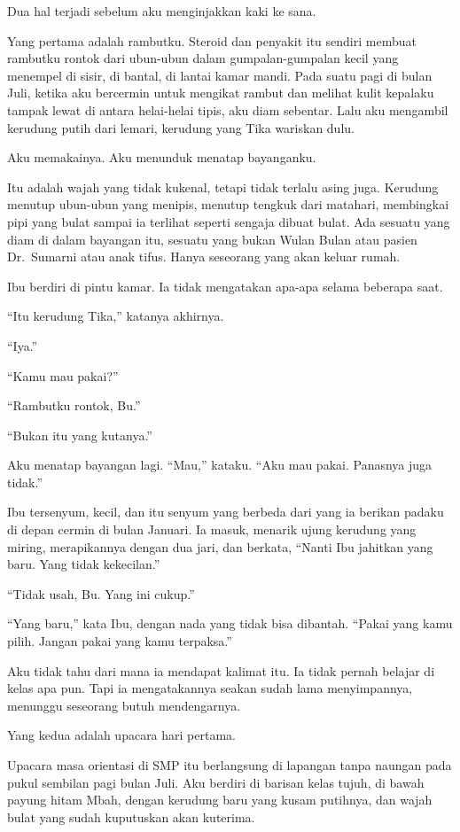 \documentclass[11pt,twoside,openany]{book}
\makeatletter
\newcommand{\scenebreak}{\par\vspace{0.9em}{\centering\textsc{*\hspace{0.7em}*\hspace{0.7em}*}\par}\vspace{0.9em}\@afterindentfalse\@afterheading}
\makeatother
\begin{document}
Dua hal terjadi sebelum aku menginjakkan kaki ke sana.

Yang pertama adalah rambutku. Steroid dan penyakit itu sendiri membuat rambutku rontok dari ubun-ubun dalam gumpalan-gumpalan kecil yang menempel di sisir, di bantal, di lantai kamar mandi. Pada suatu pagi di bulan Juli, ketika aku bercermin untuk mengikat rambut dan melihat kulit kepalaku tampak lewat di antara helai-helai tipis, aku diam sebentar. Lalu aku mengambil kerudung putih dari lemari, kerudung yang Tika wariskan dulu.

Aku memakainya. Aku menunduk menatap bayanganku.

Itu adalah wajah yang tidak kukenal, tetapi tidak terlalu asing juga. Kerudung menutup ubun-ubun yang menipis, menutup tengkuk dari matahari, membingkai pipi yang bulat sampai ia terlihat seperti sengaja dibuat bulat. Ada sesuatu yang diam di dalam bayangan itu, sesuatu yang bukan Wulan Bulan atau pasien Dr.~Sumarni atau anak tifus. Hanya seseorang yang akan keluar rumah.

Ibu berdiri di pintu kamar. Ia tidak mengatakan apa-apa selama beberapa saat.

``Itu kerudung Tika,'' katanya akhirnya.

``Iya.''

``Kamu mau pakai?''

``Rambutku rontok, Bu.''

``Bukan itu yang kutanya.''

Aku menatap bayangan lagi. ``Mau,'' kataku. ``Aku mau pakai. Panasnya juga tidak.''

Ibu tersenyum, kecil, dan itu senyum yang berbeda dari yang ia berikan padaku di depan cermin di bulan Januari. Ia masuk, menarik ujung kerudung yang miring, merapikannya dengan dua jari, dan berkata, ``Nanti Ibu jahitkan yang baru. Yang tidak kekecilan.''

``Tidak usah, Bu. Yang ini cukup.''

``Yang baru,'' kata Ibu, dengan nada yang tidak bisa dibantah. ``Pakai yang kamu pilih. Jangan pakai yang kamu terpaksa.''

Aku tidak tahu dari mana ia mendapat kalimat itu. Ia tidak pernah belajar di kelas apa pun. Tapi ia mengatakannya seakan sudah lama menyimpannya, menunggu seseorang butuh mendengarnya.

\scenebreak
Yang kedua adalah upacara hari pertama.

Upacara masa orientasi di SMP itu berlangsung di lapangan tanpa naungan pada pukul sembilan pagi bulan Juli. Aku berdiri di barisan kelas tujuh, di bawah payung hitam Mbah, dengan kerudung baru yang kusam putihnya, dan wajah bulat yang sudah kuputuskan akan kuterima.
\end{document}
